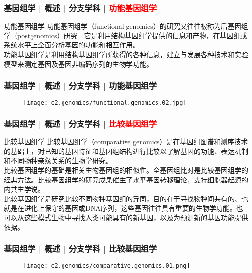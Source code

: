 \begin{frame}
  \frametitle{基因组学 | 概述 | 分支学科 | \textcolor{red}{功能基因组学}}
  \begin{block}{功能基因组学}
功能基因组学（functional genomics）的研究又往往被称为后基因组学（postgenomics）研究，它是利用结构基因组学提供的信息和产物，在基因组或系统水平上全面分析基因的功能和相互作用。\\
\vspace{1em}
功能基因组学是利用结构基因组学所获得的各种信息，建立与发展各种技术和实验模型来测定基因及基因非编码序列的生物学功能。
  \end{block}
\end{frame}

\begin{frame}
  \frametitle{基因组学 | 概述 | 分支学科 | 功能基因组学}
  \begin{figure}
    \centering
    \texttt{[image: c2.genomics/functional.genomics.02.jpg]}
  \end{figure}
\end{frame}

\begin{frame}
  \frametitle{基因组学 | 概述 | 分支学科 | \textcolor{red}{比较基因组学}}
  \begin{block}{比较基因组学}
比较基因组学（comparative genomics）是在基因组图谱和测序技术的基础上，对已知的基因特征和基因组结构进行比较以了解基因的功能、表达机制和不同物种亲缘关系的生物学研究。\\
\vspace{1em}
比较基因组学的基础是相关生物基因组的相似性。全基因组比对是比较基因组学的经典方法。比较基因组学的研究成果催生了水平基因转移理论，支持细胞器起源的内共生学说。\\
\vspace{1em}
比较基因组学是研究比较不同物种基因组的异同，目的在于寻找物种间共有的、也就是在进化上保守的基因或DNA序列，这些基因往往具有重要的生物学功能。也可以从这些模式生物中寻找人类可能具有的新基因，以及为预测新的基因功能提供依据。
  \end{block}
\end{frame}

\begin{frame}
  \frametitle{基因组学 | 概述 | 分支学科 | 比较基因组学}
  \begin{figure}
    \centering
    \texttt{[image: c2.genomics/comparative.genomics.01.png]}
  \end{figure}
\end{frame}

